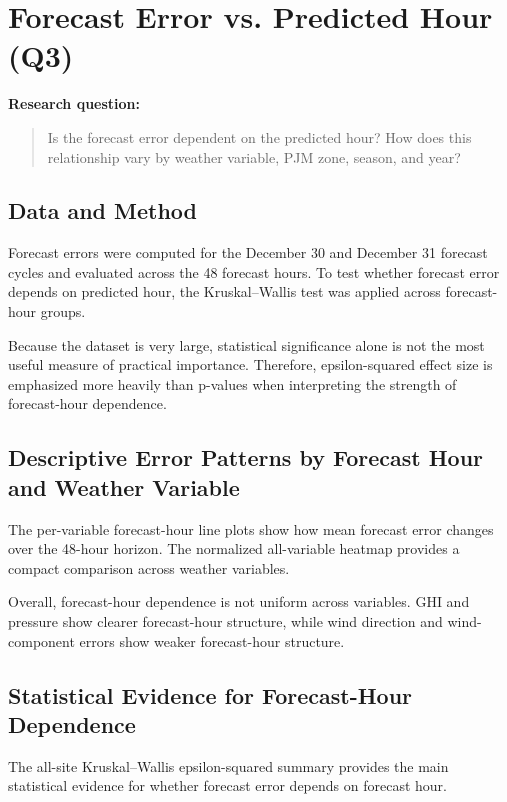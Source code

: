 \newpage
\section{Forecast Error vs. Predicted Hour (Q3)}

\textbf{Research question:}

\begin{quote}
Is the forecast error dependent on the predicted hour? How does this relationship vary by weather variable, PJM zone, season, and year?
\end{quote}

\subsection{Data and Method}

Forecast errors were computed for the December 30 and December 31 forecast cycles and evaluated across the 48 forecast hours. To test whether forecast error depends on predicted hour, the Kruskal--Wallis test was applied across forecast-hour groups.

Because the dataset is very large, statistical significance alone is not the most useful measure of practical importance. Therefore, epsilon-squared effect size is emphasized more heavily than p-values when interpreting the strength of forecast-hour dependence.

\subsection{Descriptive Error Patterns by Forecast Hour and Weather Variable}

The per-variable forecast-hour line plots show how mean forecast error changes over the 48-hour horizon. The normalized all-variable heatmap provides a compact comparison across weather variables.

Overall, forecast-hour dependence is not uniform across variables. GHI and pressure show clearer forecast-hour structure, while wind direction and wind-component errors show weaker forecast-hour structure.


\subsection{Statistical Evidence for Forecast-Hour Dependence}

The all-site Kruskal--Wallis epsilon-squared summary provides the main statistical evidence for whether forecast error depends on forecast hour.

